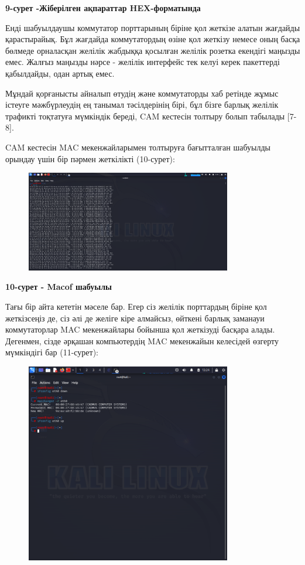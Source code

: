 {\bfseries 9-сурет -Жіберілген ақпараттар HEX-форматында}

Енді шабуылдаушы коммутатор порттарының біріне қол жеткізе алатын
жағдайды қарастырайық. Бұл жағдайда коммутатордың өзіне қол жеткізу
немесе оның басқа бөлмеде орналасқан желілік жабдыққа қосылған желілік
розетка екендігі маңызды емес. Жалғыз маңызды нәрсе - желілік интерфейс
тек келуі керек пакеттерді қабылдайды, одан артық емес.

Мұндай қорғанысты айналып өтудің және коммутаторды хаб ретінде жұмыс
істеуге мәжбүрлеудің ең танымал тәсілдерінің бірі, бұл бізге барлық
желілік трафикті тоқтатуға мүмкіндік береді, CAM кестесін толтыру болып
табылады {[}7-8{]}.

CAM кестесін MAC мекенжайларымен толтыруға бағытталған шабуылды орындау
үшін бір пәрмен жеткілікті (10-сурет):

\begin{figure}[H]
	\centering
	\includegraphics[width=0.8\textwidth]{assets/34}
	\caption*{}
\end{figure}

{\bfseries 10-сурет - Macof шабуылы}

Тағы бір айта кететін мәселе бар. Егер сіз желілік порттардың біріне қол
жеткізсеңіз де, сіз әлі де желіге кіре алмайсыз, өйткені барлық заманауи
коммутаторлар MAC мекенжайлары бойынша қол жеткізуді басқара алады.
Дегенмен, сізде әрқашан компьютердің MAC мекенжайын келесідей өзгерту
мүмкіндігі бар (11-сурет):

\begin{figure}[H]
	\centering
	\includegraphics[width=0.8\textwidth]{assets/35}
	\caption*{}
\end{figure}

